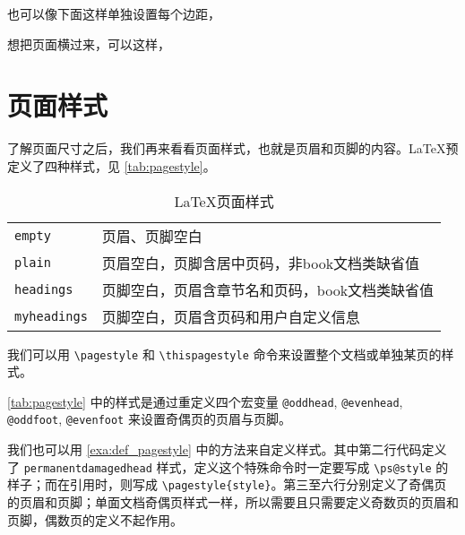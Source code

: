 也可以像下面这样单独设置每个边距，

\begin{Code}[]
\usepackage[top=2in, bottom=1in, left=1in, right=1in]{geometry}
\end{Code}

想把页面横过来，可以这样，

\begin{Code}[]
\usepackage[landscape]{geometry}
\end{Code}

\section{页面样式}

了解页面尺寸之后，我们再来看看页面样式，也就是页眉和页脚的内容。\LaTeX 预定义了四种样式，见 \autoref{tab:pagestyle}。

\begin{table}[htbp]
\caption{\LaTeX 页面样式}
\label{tab:pagestyle}
\centering
\begin{tabular}{ll}
    \toprule
    \texttt{empty} & 页眉、页脚空白 \\
    \texttt{plain} & 页眉空白，页脚含居中页码，非book文档类缺省值 \\
    \texttt{headings} & 页脚空白，页眉含章节名和页码，book文档类缺省值 \\
    \texttt{myheadings} & 页脚空白，页眉含页码和用户自定义信息 \\
    \bottomrule
\end{tabular}
\end{table}

我们可以用 \verb|\pagestyle| 和 \verb|\thispagestyle| 命令来设置整个文档或单独某页的样式。

\begin{Code}[numbers=none]
\pagestyle{plain}    %
\thispagestyle{empty}%
\end{Code}

\autoref{tab:pagestyle} 中的样式是通过重定义四个宏变量 \texttt{@oddhead}, \texttt{@evenhead}, \texttt{@oddfoot}, \texttt{@evenfoot} 来设置奇偶页的页眉与页脚。

我们也可以用 \autoref{exa:def_pagestyle} 中的方法来自定义样式。其中第二行代码定义了 \texttt{permanentdamagedhead} 样式，定义这个特殊命令时一定要写成 \verb|\ps@style| 的样子；而在引用时，则写成 \verb|\pagestyle{style}|。第三至六行分别定义了奇偶页的页眉和页脚；单面文档奇偶页样式一样，所以需要且只需要定义奇数页的页眉和页脚，偶数页的定义不起作用。

